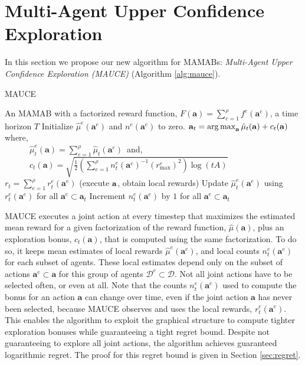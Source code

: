 \documentclass{article}
\DeclareMathOperator*{\argmax}{arg\,max}
\newcommand{\est}{\hat{\mu}}
\begin{document}
\section{Multi-Agent Upper Confidence Exploration}\label{sec:algo}
In this section we propose our new algorithm for MAMABs: \emph{Multi-Agent Upper Confidence Exploration (MAUCE)} (Algorithm \ref{alg:mauce}).
\begin{algorithm}[t]
   \caption{MAUCE}
   \label{alg:mauce}
\begin{algorithmic}[1]
    An MAMAB with a factorized reward function, $F(\mathbf{a}) = \sum^\rho_{e=1} f^e(\mathbf{a}^e)$, a time horizon $T$
   \STATE Initialize $\hat{\mu}^e (\mathbf{a}^e)$ and $n^e(\mathbf{a}^e)$ to zero.
   \STATE ${\bf a}_t = \argmax_{\bf a}  \est_t(\mathbf{a}) + c_t(\mathbf{a})\,$
   		where, \\ ~~~~~~$\est^e_t(\mathbf{a}) = \sum_{e=1}^\rho \est_t(\mathbf{a}^e) \,$ and, \\
~~~~~~$c_t(\mathbf{a}) = \sqrt{ \frac{1}{2} \left(\sum_{e=1}^\rho n^e_t(\mathbf{a}^e)^{-1} (r_{\max}^e)^2 \right) \log ( t A )} $
  \STATE $r_t\!=\!\sum_{e=1}^\rho\! r^e_t(\mathbf{a}^e)$ (execute $\bf a$, obtain local rewards)
   \STATE Update $\hat{\mu}^e_t (\mathbf{a}^e)$ using $r^e_t(\mathbf{a}^e)$  for all $\mathbf{a}^e \subset \mathbf{a}_t$
  \STATE Increment $n^e_t(\mathbf{a}^e)$ by $1$ for all $\mathbf{a}^e \subset \mathbf{a}_t$
   \ENDFOR
\end{algorithmic}
\end{algorithm}

MAUCE executes a joint action at every timestep that maximizes the estimated mean reward for a given factorization of the reward function, $\est(\mathbf{a})$, plus an exploration bonus, $c_t(\mathbf{a})$,  that is computed using the same factorization. To do so, it keeps mean estimates of local rewards $\hat{\mu}^e(\mathbf{a}^e)$, and local counts $n^e_t(\mathbf{a}^e)$ for each subset of agents. These local estimates depend only on the subset of actions $\mathbf{a}^e \subset \mathbf{a}$ for this group of agents $\mathcal{D}^e \subset \mathcal{D}$.
Not all joint actions have to be selected often, or even at all.  Note that the counts
$n^e_t(\mathbf{a}^e)$ used to compute the bonus for an action $\mathbf{a}$ can change over time,
even if the joint action $\mathbf{a}$ has never been selected, because MAUCE observes and uses the
local rewards, $r^e_t(\mathbf{a}^e)$.  This enables the algorithm to exploit the graphical structure
to compute tighter exploration bonuses while guaranteeing a tight regret bound. Despite not
guaranteeing to explore all joint actions, the algorithm achieves guaranteed logarithmic regret. The
proof for this regret bound is given in Section \ref{sec:regret}.
\end{document}
